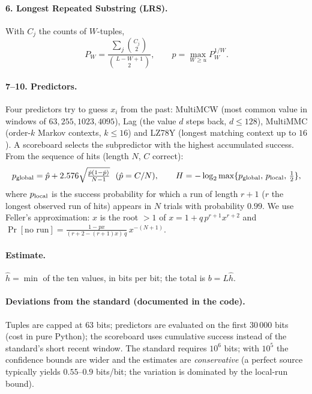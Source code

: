 \documentclass[11pt,a4paper]{article}
\theoremstyle{plain}
\theoremstyle{definition}
\begin{document}
\paragraph{6. Longest Repeated Substring (LRS).} With $C_j$ the counts of
$W$-tuples,
\begin{equation}
P_W=\frac{\sum_j\binom{C_j}{2}}{\binom{L-W+1}{2}},\qquad p=\max_{W\ge u}P_W^{1/W}.
\end{equation}

\paragraph{7--10. Predictors.} Four predictors try to guess $x_i$ from the
past: MultiMCW (most common value in windows of $63,255,1023,4095$), Lag
(the value $d$ steps back, $d\le128$), MultiMMC (order-$k$ Markov contexts,
$k\le16$) and LZ78Y (longest matching context up to $16$). A scoreboard selects
the subpredictor with the highest accumulated success. From the sequence of
hits (length $N$, $C$ correct):
\begin{equation}
    p_{\rm global}=\hat p+2.576\sqrt{\tfrac{\hat p(1-\hat p)}{N-1}}\ \ (\hat p=C/N),\qquad
    H=-\log_2\max\{p_{\rm global},\,p_{\rm local},\,\tfrac12\},
\end{equation}
where $p_{\rm local}$ is the success probability for which a run of length
$r+1$ ($r$ the longest observed run of hits) appears in $N$ trials with
probability $0.99$. We use Feller's approximation:
$x$ is the root $>1$ of $x=1+q\,p^{r+1}x^{r+2}$ and
$\Pr[\text{no run}]=\frac{1-px}{(r+2-(r+1)x)\,q}\,x^{-(N+1)}$.

\paragraph{Estimate.} $\hat h=\min$ of the ten values, in bits per bit; the total
is $b=L\hat h$.

\paragraph{Deviations from the standard (documented in the code).} Tuples are
capped at $63$ bits; predictors are evaluated on the first $30\,000$ bits (cost
in pure Python); the scoreboard uses cumulative success instead of the
standard's short recent window. The standard requires $10^6$ bits; with $10^5$
the confidence bounds are wider and the estimates are \emph{conservative}
(a perfect source typically yields $0.55$--$0.9$ bits/bit; the variation is
dominated by the local-run bound).
\end{document}

